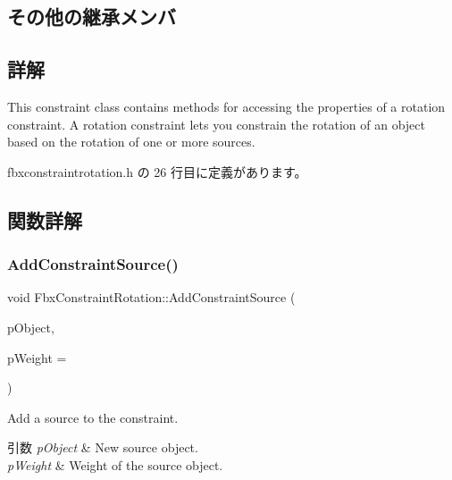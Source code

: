 \subsection*{その他の継承メンバ}


\subsection{詳解}
This constraint class contains methods for accessing the properties of a rotation constraint. A rotation constraint lets you constrain the rotation of an object based on the rotation of one or more sources. 

 fbxconstraintrotation.\+h の 26 行目に定義があります。



\subsection{関数詳解}
\mbox{\label{class_fbx_constraint_rotation_ac025636c53dc8316f7da590de99bdb20}} 
\subsubsection{\texorpdfstring{Add\+Constraint\+Source()}{AddConstraintSource()}}
{\footnotesize\ttfamily void Fbx\+Constraint\+Rotation\+::\+Add\+Constraint\+Source (\begin{DoxyParamCaption}\item[{\hyperlink{class_fbx_object}{Fbx\+Object} $\ast$}]{p\+Object,  }\item[{double}]{p\+Weight = {} }\end{DoxyParamCaption})}

Add a source to the constraint. 
\begin{DoxyParams}{引数}
{\em p\+Object} & New source object. \\
\hline
{\em p\+Weight} & Weight of the source object. \\
\hline
\end{DoxyParams}
\mbox{\label{class_fbx_constraint_rotation_ad9f6469905777a18e3a383f402bdd9b0}} 
